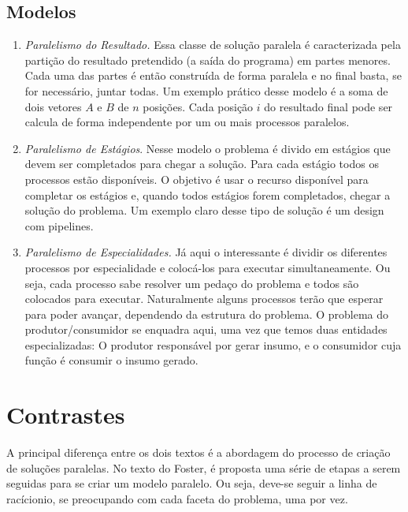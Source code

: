 \documentclass[12pt]{article}
\begin{document}
\subsection{Modelos}
\begin{enumerate}
\item \emph{Paralelismo do Resultado.}
	Essa classe de solução paralela é caracterizada pela partição do
	resultado pretendido (a saída do programa) em partes menores. Cada uma
	das partes é então construída de forma paralela e no final basta,
	se for necessário, juntar todas. Um exemplo prático desse modelo é 
	a soma de dois vetores $A$ e $B$ de $n$ posições. Cada posição $i$
	do resultado final pode ser calcula de forma independente por um 
	ou mais processos paralelos.

\item \emph{Paralelismo de Estágios}.
	Nesse modelo o problema é divido em estágios que devem ser completados
	para chegar a solução. Para cada estágio todos os processos estão disponíveis.	
	O objetivo é usar o recurso disponível para completar os estágios e, quando
	todos estágios forem completados, chegar a solução do problema. Um exemplo claro
	desse tipo de solução é um design com pipelines.
	
\item \emph{Paralelismo de Especialidades.}
	Já aqui o interessante é dividir os diferentes processos 
	por especialidade e colocá-los para executar simultaneamente. 
	Ou seja, cada processo sabe resolver um pedaço do problema e todos
	são colocados para executar. Naturalmente alguns processos terão que 
	esperar para poder avançar, dependendo da estrutura do problema.
	O problema do produtor/consumidor se enquadra
	aqui, uma vez que temos duas entidades especializadas: O produtor responsável
	por gerar insumo, e o consumidor cuja função é consumir o insumo gerado.
	
\end{enumerate}

\section{Contrastes}

A principal diferença entre os dois textos é a abordagem do processo
de criação de soluções paralelas. No texto do Foster, é proposta uma série de 
etapas a serem seguidas para se criar um modelo paralelo. Ou seja, deve-se
seguir a linha de racícionio, se preocupando com cada faceta do problema, uma por vez.
\end{document}
